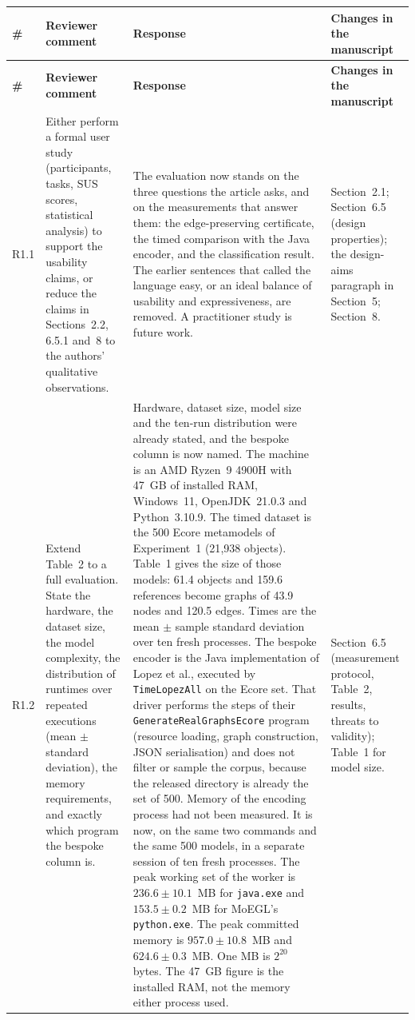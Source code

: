 \documentclass[11pt,a4paper]{article}
\begin{document}
\begin{longtable}{@{}P{1.0cm}P{4.3cm}P{5.9cm}P{3.9cm}@{}}
\toprule
\textbf{\#} & \textbf{Reviewer comment} & \textbf{Response} & \textbf{Changes in the manuscript} \\
\midrule
\endfirsthead
\toprule
\textbf{\#} & \textbf{Reviewer comment} & \textbf{Response} & \textbf{Changes in the manuscript} \\
\midrule
\endhead
\bottomrule
\endfoot

R1.1 &
Either perform a formal user study (participants, tasks, SUS scores, statistical analysis) to support the usability claims, or reduce the claims in Sections~2.2, 6.5.1 and~8 to the authors' qualitative observations. &
The evaluation now stands on the three questions the article asks, and on the measurements that answer them: the edge-preserving certificate, the timed comparison with the Java encoder, and the classification result. The earlier sentences that called the language easy, or an ideal balance of usability and expressiveness, are removed. A practitioner study is future work. &
Section~2.1; Section~6.5 (design properties); the design-aims paragraph in Section~5; Section~8. \\
\midrule

R1.2 &
Extend Table~2 to a full evaluation. State the hardware, the dataset size, the model complexity, the distribution of runtimes over repeated executions (mean $\pm$ standard deviation), the memory requirements, and exactly which program the bespoke column is. &
Hardware, dataset size, model size and the ten-run distribution were already stated, and the bespoke column is now named. The machine is an AMD Ryzen~9 4900H with 47~GB of installed RAM, Windows~11, OpenJDK~21.0.3 and Python~3.10.9. The timed dataset is the 500 Ecore metamodels of Experiment~1 (21{,}938 objects). Table~1 gives the size of those models: 61.4 objects and 159.6 references become graphs of 43.9 nodes and 120.5 edges. Times are the mean $\pm$ sample standard deviation over ten fresh processes. The bespoke encoder is the Java implementation of Lopez et al., executed by \texttt{TimeLopezAll} on the Ecore set. That driver performs the steps of their \texttt{GenerateRealGraphsEcore} program (resource loading, graph construction, JSON serialisation) and does not filter or sample the corpus, because the released directory is already the set of 500.
Memory of the encoding process had not been measured. It is now, on the same two commands and the same 500 models, in a separate session of ten fresh processes. The peak working set of the worker is $236.6\pm10.1$~MB for \texttt{java.exe} and $153.5\pm0.2$~MB for MoEGL's \texttt{python.exe}. The peak committed memory is $957.0\pm10.8$~MB and $624.6\pm0.3$~MB. One MB is $2^{20}$ bytes. The 47~GB figure is the installed RAM, not the memory either process used. &
Section~6.5 (measurement protocol, Table~2, results, threats to validity); Table~1 for model size. \\
\midrule


\end{longtable}
\end{document}
